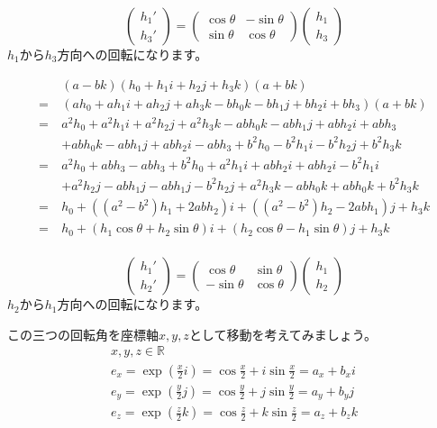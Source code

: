 \documentclass[a4paper,12pt,notitlepage]{jsreport}
\begin{document}
\begin{equation}
  \begin{pmatrix}h_1'\\h_3'\end{pmatrix}
  =\begin{pmatrix}\cos\theta&-\sin\theta\\\sin\theta&\cos\theta\end{pmatrix}
  \begin{pmatrix}h_1\\h_3\end{pmatrix}
\end{equation}
$h_1$から$h_3$方向への回転になります。

\begin{equation}
  \begin{split}
    &(a-bk)(h_0+h_1i+h_2j+h_3k)(a+bk)\\
    =~&(ah_0+ah_1i+ah_2j+ah_3k-bh_0k-bh_1j+bh_2i+bh_3)(a+bk)\\
    =~&a^2h_0+a^2h_1i+a^2h_2j+a^2h_3k-abh_0k-abh_1j+abh_2i+abh_3\\
    &+abh_0k-abh_1j+abh_2i-abh_3+b^2h_0-b^2h_1i-b^2h_2j+b^2h_3k\\
    =~&a^2h_0+abh_3-abh_3+b^2h_0+a^2h_1i+abh_2i+abh_2i-b^2h_1i\\
    &+a^2h_2j-abh_1j-abh_1j-b^2h_2j+a^2h_3k-abh_0k+abh_0k+b^2h_3k\\
    =~&h_0+((a^2-b^2)h_1+2abh_2)i+((a^2-b^2)h_2-2abh_1)j+h_3k\\
    =~&h_0+(h_1\cos\theta+h_2\sin\theta)i+(h_2\cos\theta-h_1\sin\theta)j+h_3k\\
  \end{split}
\end{equation}

\begin{equation}
  \begin{pmatrix}h_1'\\h_2'\end{pmatrix}
  =\begin{pmatrix}\cos\theta&\sin\theta\\-\sin\theta&\cos\theta\end{pmatrix}
  \begin{pmatrix}h_1\\h_2\end{pmatrix}
\end{equation}
$h_2$から$h_1$方向への回転になります。

この三つの回転角を座標軸$x,y,z$として移動を考えてみましょう。
\begin{gather}
  x,y,z\in\mathbb{R}\\
  e_x=\exp\left(\frac{x}{2}i\right)=\cos\frac{x}{2}+i\sin\frac{x}{2}=a_x+b_xi\\
  e_y=\exp\left(\frac{y}{2}j\right)=\cos\frac{y}{2}+j\sin\frac{y}{2}=a_y+b_yj\\
  e_z=\exp\left(\frac{z}{2}k\right)=\cos\frac{z}{2}+k\sin\frac{z}{2}=a_z+b_zk
\end{gather}
\end{document}
